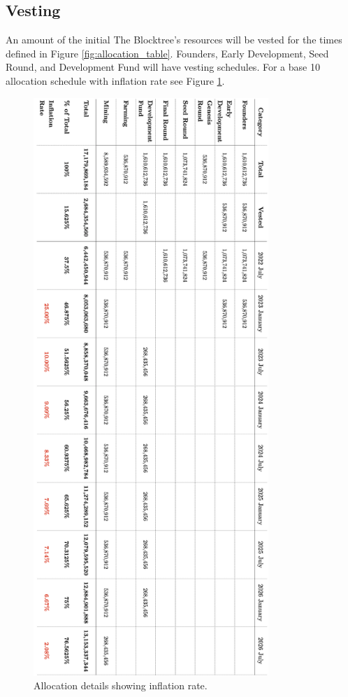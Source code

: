 \documentclass[12pt]{article}
\begin{document}
\subsection{Vesting}

An amount of the initial The Blocktree's resources will be vested for the times defined in Figure \ref{fig:allocation_table}. Founders, Early Development, Seed Round, and Development Fund will have vesting schedules. For a base 10 allocation schedule with inflation rate see Figure \ref{fig:allocation_table2}.









\begin{figure}[H]
\centering
  \includegraphics[width=3.5in]{images/The_Blocktree_Allocation_Table_2.png}
  \caption{Allocation details showing inflation rate.}
  \label{fig:allocation_table2}
\end{figure}
\end{document}
